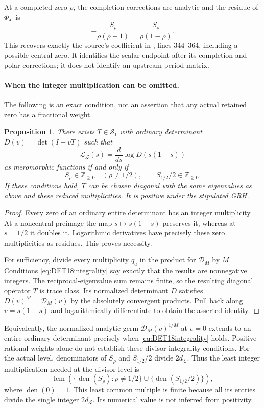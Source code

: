 \documentclass[11pt,a4paper]{article}
\newtheorem*{proposition}{Proposition}
\begin{document}
At a completed zero $\rho$, the completion corrections are analytic
and the residue of $\Phi_{\mathcal L}$ is
\[
 -\frac{S_\rho}{\rho(\rho-1)}
 =\frac{S_\rho}{\rho(1-\rho)}.
\]
This recovers exactly the source's coefficient in
, lines 344--364, including a possible central
zero. It identifies the scalar endpoint after its completion and
polar corrections; it does not identify an upstream period matrix.

\paragraph{When the integer multiplication can be omitted.}
The following is an exact condition, not an assertion that any
actual retained zero has a fractional weight.
\begin{proposition}
There exists $T\in\mathcal S_1$ with ordinary determinant
$D(v)=\det(I-vT)$ such that
\[
 \mathscr L_{\mathcal L}(s)
 =\frac{d}{ds}\log D(s(1-s))
\]
as meromorphic functions if and only if
\begin{equation}\label{eq:DET18integrality}
 S_\rho\in\mathbb Z_{\ge0}\quad(\rho\ne1/2),\qquad
 S_{1/2}/2\in\mathbb Z_{\ge0}.
\end{equation}
If these conditions hold, $T$ can be chosen diagonal with the same
eigenvalues as above and these reduced multiplicities. It is positive
under the stipulated GRH.
\end{proposition}
\begin{proof}
Every zero of an ordinary entire determinant has an integer
multiplicity. At a noncentral preimage the map $s\mapsto s(1-s)$
preserves it, whereas at $s=1/2$ it doubles it. Logarithmic
derivatives have precisely these zero multiplicities as residues.
This proves necessity.

For sufficiency, divide every multiplicity $q_a$ in the product for
$\mathscr D_M$ by $M$. Conditions
\eqref{eq:DET18integrality} say exactly that the results are
nonnegative integers. The reciprocal-eigenvalue sum remains finite,
so the resulting diagonal operator $T$ is trace class. Its
normalized determinant $D$ satisfies $D(v)^M=\mathscr D_M(v)$ by
the absolutely convergent products. Pull back along $v=s(1-s)$
and logarithmically differentiate to obtain the asserted identity.
\end{proof}

Equivalently, the normalized analytic germ
$\mathscr D_M(v)^{1/M}$ at $v=0$ extends to an entire ordinary
determinant precisely when \eqref{eq:DET18integrality} holds.
Positive rational weights alone do not establish these
divisor-integrality conditions. For the actual level, denominators
of $S_\rho$ and $S_{1/2}/2$ divide $2d_{\mathcal L}$. Thus the least
integer multiplication needed at the divisor level is
\[
 \operatorname{lcm}\left(
 \{\operatorname{den}(S_\rho):\rho\ne1/2\}
 \cup\{\operatorname{den}(S_{1/2}/2)\}\right),
\]
where $\operatorname{den}(0)=1$. This least common multiple is
finite because all its entries divide the single integer
$2d_{\mathcal L}$. Its numerical value is not inferred from
positivity.
\end{document}
